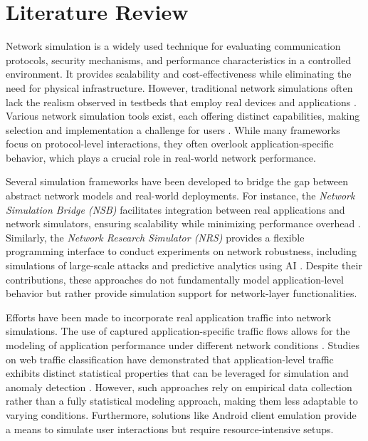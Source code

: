 \section{Literature Review}
Network simulation is a widely used technique for evaluating communication protocols, security mechanisms, and performance characteristics in a controlled environment. It provides scalability and cost-effectiveness while eliminating the need for physical infrastructure. However, traditional network simulations often lack the realism observed in testbeds that employ real devices and applications \cite{gomez2023survey}. Various network simulation tools exist, each offering distinct capabilities, making selection and implementation a challenge for users \cite{smera2022networks}. While many frameworks focus on protocol-level interactions, they often overlook application-specific behavior, which plays a crucial role in real-world network performance.

Several simulation frameworks have been developed to bridge the gap between abstract network models and real-world deployments. For instance, the \textit{Network Simulation Bridge (NSB)} facilitates integration between real applications and network simulators, ensuring scalability while minimizing performance overhead \cite{kuttivelil2023network}. Similarly, the \textit{Network Research Simulator (NRS)} provides a flexible programming interface to conduct experiments on network robustness, including simulations of large-scale attacks and predictive analytics using AI \cite{marzo2022network}. Despite their contributions, these approaches do not fundamentally model application-level behavior but rather provide simulation support for network-layer functionalities.

Efforts have been made to incorporate real application traffic into network simulations. The use of captured application-specific traffic flows allows for the modeling of application performance under different network conditions \cite{zacks2021systems}. Studies on web traffic classification have demonstrated that application-level traffic exhibits distinct statistical properties that can be leveraged for simulation and anomaly detection \cite{karayaka2022application}. However, such approaches rely on empirical data collection rather than a fully statistical modeling approach, making them less adaptable to varying conditions. Furthermore, solutions like Android client emulation \cite{hetu2014similitude} provide a means to simulate user interactions but require resource-intensive setups.


